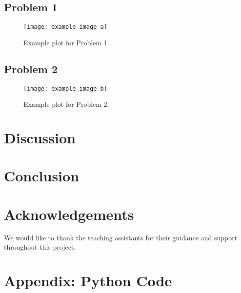 \documentclass[a4paper,12pt]{article}
\begin{document}
\subsection{Problem 1}
\lipsum[7]
\begin{figure}[H]
    \centering
    \texttt{[image: example-image-a]}
    \caption{Example plot for Problem 1.}
    \label{fig:problem1}
\end{figure}

\subsection{Problem 2}
\lipsum[8]
\begin{figure}[H]
    \centering
    \texttt{[image: example-image-b]}
    \caption{Example plot for Problem 2\cite{nocedalwright2006numerical}.}
    \label{fig:problem2}
\end{figure}

\section{Discussion}
\lipsum[9]

\section{Conclusion}
\lipsum[10]

\section*{Acknowledgements}
We would like to thank the teaching assistants for their guidance and support throughout this project.




\appendix
\section{Appendix: Python Code}
\inputminted{python}{code/code.py}
\end{document}
